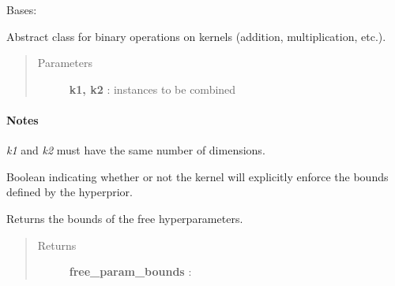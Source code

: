 \documentclass[letterpaper,10pt,english]{sphinxmanual}
\begin{document}
\begin{fulllineitems}
\label{gptools.kernel:gptools.kernel.core.BinaryKernel}
Bases: {\hyperref[gptools.kernel:gptools.kernel.core.Kernel]{}}

Abstract class for binary operations on kernels (addition, multiplication, etc.).
\begin{quote}\begin{description}
\item[{Parameters}] \leavevmode
\textbf{k1, k2} : {\hyperref[gptools.kernel:gptools.kernel.core.Kernel]{}} instances to be combined

\end{description}\end{quote}
\paragraph{Notes}

\emph{k1} and \emph{k2} must have the same number of dimensions.

\begin{fulllineitems}
\label{gptools.kernel:gptools.kernel.core.BinaryKernel.enforce_bounds}
Boolean indicating whether or not the kernel will explicitly enforce the bounds defined by the hyperprior.

\end{fulllineitems}


\begin{fulllineitems}
\label{gptools.kernel:gptools.kernel.core.BinaryKernel.fixed_params}
\end{fulllineitems}


\begin{fulllineitems}
\label{gptools.kernel:gptools.kernel.core.BinaryKernel.free_param_bounds}
Returns the bounds of the free hyperparameters.
\begin{quote}\begin{description}
\item[{Returns}] \leavevmode
\textbf{free\_param\_bounds} : 
\begin{quote}


\end{quote}
\end{description}
\end{quote}
\end{fulllineitems}
\end{fulllineitems}
\end{document}
